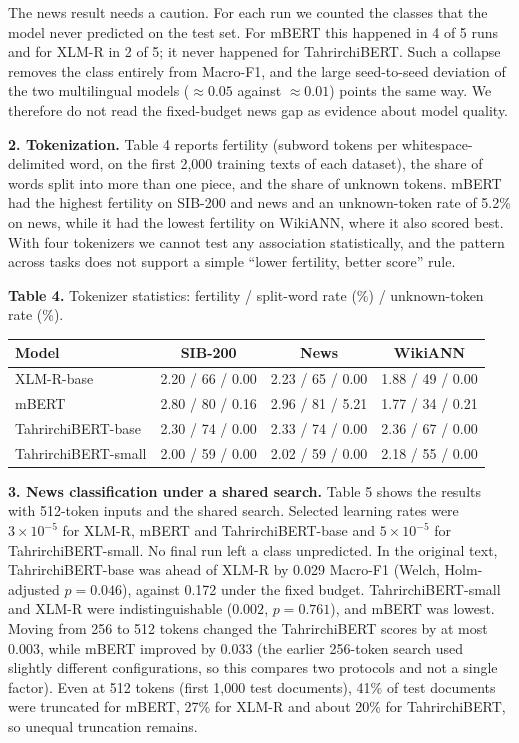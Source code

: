 \documentclass[11pt]{book}
\begin{document}
The news result needs a caution. For each run we counted the classes that the model never predicted on the test set. For mBERT this happened in 4 of 5 runs and for XLM-R in 2 of 5; it never happened for TahrirchiBERT. Such a collapse removes the class entirely from Macro-F1, and the large seed-to-seed deviation of the two multilingual models ($\approx0.05$ against $\approx0.01$) points the same way. We therefore do not read the fixed-budget news gap as evidence about model quality.

\textbf{2. Tokenization.} Table 4 reports fertility (subword tokens per whitespace-delimited word, on the first 2,000 training texts of each dataset), the share of words split into more than one piece, and the share of unknown tokens. mBERT had the highest fertility on SIB-200 and news and an unknown-token rate of 5.2\% on news, while it had the lowest fertility on WikiANN, where it also scored best. With four tokenizers we cannot test any association statistically, and the pattern across tasks does not support a simple ``lower fertility, better score'' rule.

\begin{center}
\textbf{Table 4.} Tokenizer statistics: fertility / split-word rate (\%) / unknown-token rate (\%).\\[2pt]
\begin{tabular}{lccc}
\hline
Model & SIB-200 & News & WikiANN \\
\hline
XLM-R-base & 2.20 / 66 / 0.00 & 2.23 / 65 / 0.00 & 1.88 / 49 / 0.00 \\
mBERT & 2.80 / 80 / 0.16 & 2.96 / 81 / 5.21 & 1.77 / 34 / 0.21 \\
TahrirchiBERT-base & 2.30 / 74 / 0.00 & 2.33 / 74 / 0.00 & 2.36 / 67 / 0.00 \\
TahrirchiBERT-small & 2.00 / 59 / 0.00 & 2.02 / 59 / 0.00 & 2.18 / 55 / 0.00 \\
\hline
\end{tabular}
\end{center}

\textbf{3. News classification under a shared search.} Table 5 shows the results with 512-token inputs and the shared search. Selected learning rates were $3\times10^{-5}$ for XLM-R, mBERT and TahrirchiBERT-base and $5\times10^{-5}$ for TahrirchiBERT-small. No final run left a class unpredicted. In the original text, TahrirchiBERT-base was ahead of XLM-R by 0.029 Macro-F1 (Welch, Holm-adjusted $p=0.046$), against 0.172 under the fixed budget. TahrirchiBERT-small and XLM-R were indistinguishable ($0.002$, $p=0.761$), and mBERT was lowest. Moving from 256 to 512 tokens changed the TahrirchiBERT scores by at most 0.003, while mBERT improved by 0.033 (the earlier 256-token search used slightly different configurations, so this compares two protocols and not a single factor). Even at 512 tokens (first 1,000 test documents), 41\% of test documents were truncated for mBERT, 27\% for XLM-R and about 20\% for TahrirchiBERT, so unequal truncation remains.
\end{document}
